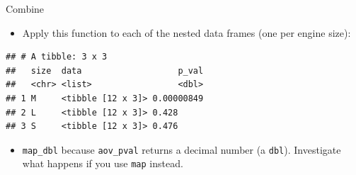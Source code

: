 \documentclass[
  ignorenonframetext,
]{beamer}
\newenvironment{Shaded}{\begin{snugshade}}{\end{snugshade}}
\newcommand{\DataTypeTok}[1]{\textcolor[rgb]{0.13,0.29,0.53}{#1}}
\newcommand{\KeywordTok}[1]{\textcolor[rgb]{0.13,0.29,0.53}{\textbf{#1}}}
\newcommand{\NormalTok}[1]{#1}
\newcommand{\OperatorTok}[1]{\textcolor[rgb]{0.81,0.36,0.00}{\textbf{#1}}}
\newcommand{\StringTok}[1]{\textcolor[rgb]{0.31,0.60,0.02}{#1}}
\providecommand{\tightlist}{%
  \setlength{\itemsep}{0pt}\setlength{\parskip}{0pt}}
\begin{document}
\begin{frame}[fragile]{Combine}
\protect\hypertarget{combine}{}

\begin{itemize}
\tightlist
\item
  Apply this function to each of the nested data frames (one per engine
  size):
\end{itemize}

\begin{Shaded}
\end{Shaded}

\begin{verbatim}
## # A tibble: 3 x 3
##   size  data                   p_val
##   <chr> <list>                 <dbl>
## 1 M     <tibble [12 x 3]> 0.00000849
## 2 L     <tibble [12 x 3]> 0.428     
## 3 S     <tibble [12 x 3]> 0.476
\end{verbatim}

\begin{itemize}
\tightlist
\item
  \texttt{map\_dbl} because \texttt{aov\_pval} returns a decimal number
  (a \texttt{dbl}). Investigate what happens if you use \texttt{map}
  instead.
\end{itemize}

\end{frame}
\end{document}
